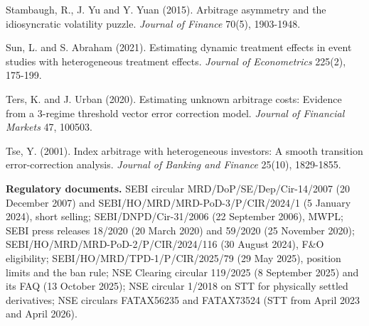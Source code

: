 \begin{description}[leftmargin=1.2em,itemsep=1pt,font=\normalfont]
\item Stambaugh, R., J. Yu and Y. Yuan (2015). Arbitrage asymmetry and the idiosyncratic volatility puzzle. \emph{Journal of Finance} 70(5), 1903-1948.
\item Sun, L. and S. Abraham (2021). Estimating dynamic treatment effects in event studies with heterogeneous treatment effects. \emph{Journal of Econometrics} 225(2), 175-199.
\item Ters, K. and J. Urban (2020). Estimating unknown arbitrage costs: Evidence from a 3-regime threshold vector error correction model. \emph{Journal of Financial Markets} 47, 100503.
\item Tse, Y. (2001). Index arbitrage with heterogeneous investors: A smooth transition error-correction analysis. \emph{Journal of Banking and Finance} 25(10), 1829-1855.
\end{description}
\vspace{6pt}
{\sloppy\noindent\textbf{Regulatory documents.} SEBI circular MRD/DoP/SE/Dep/Cir-14/2007 (20 December 2007) and
SEBI/HO/MRD/MRD-PoD-3/P/CIR/2024/1 (5 January 2024), short selling; SEBI/DNPD/Cir-31/2006 (22 September 2006), MWPL; SEBI
press releases 18/2020 (20 March 2020) and 59/2020 (25 November 2020); SEBI/HO/MRD/MRD-PoD-2/P/CIR/2024/116 (30 August
2024), F\&O eligibility; SEBI/HO/MRD/TPD-1/P/CIR/2025/79 (29 May 2025), position limits and the ban rule; NSE Clearing
circular 119/2025 (8 September 2025) and its FAQ (13 October 2025); NSE circular 1/2018 on STT for physically settled
derivatives; NSE circulars FATAX56235 and FATAX73524 (STT from April 2023 and April 2026).\par}
